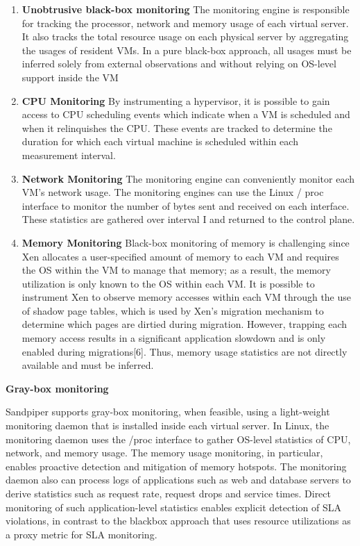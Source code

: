 \documentclass[conference]{IEEEtran}
\begin{document}
\begin{enumerate}
\item{\textbf{Unobtrusive black-box monitoring}} The monitoring engine is responsible for tracking the processor, network and memory usage of each virtual server.
It also tracks the total resource usage on each physical
server by aggregating the usages of resident VMs.
In a pure black-box approach, all usages must be inferred
solely from external observations and without relying
on OS-level support inside the VM

\item{\textbf{CPU Monitoring}} By instrumenting a hypervisor,
it is possible to gain access to CPU
scheduling events which indicate when a VM is scheduled
and when it relinquishes the CPU. These events are tracked
to determine the duration for which each virtual machine
is scheduled within each measurement interval.

\item{\textbf{Network Monitoring}} The monitoring engine can conveniently
monitor each VM’s network usage. The monitoring engines can use the Linux /
proc interface to monitor the number of bytes sent and received on each interface.
These statistics are gathered over interval I and returned
to the control plane.

\item{\textbf{Memory Monitoring}} Black-box monitoring of memory
is challenging since Xen allocates a user-specified amount
of memory to each VM and requires the OS within the VM
to manage that memory; as a result, the memory utilization
is only known to the OS within each VM. It is possible
to instrument Xen to observe memory accesses within
each VM through the use of shadow page tables, which is
used by Xen’s migration mechanism to determine which
pages are dirtied during migration. However, trapping each
memory access results in a significant application slowdown
and is only enabled during migrations[6]. Thus,
memory usage statistics are not directly available and
must be inferred.


\end{enumerate}


\textbf{Gray-box monitoring}




Sandpiper supports gray-box monitoring, when feasible,
using a light-weight monitoring daemon that is installed
inside each virtual server. In Linux, the monitoring daemon uses the /proc interface to gather OS-level statistics of CPU, network, and memory usage.
The memory usage monitoring, in particular, enables proactive
detection and mitigation of memory hotspots. The
monitoring daemon also can process logs of applications
such as web and database servers to derive statistics such
as request rate, request drops and service times. Direct
monitoring of such application-level statistics enables explicit
detection of SLA violations, in contrast to the blackbox
approach that uses resource utilizations as a proxy
metric for SLA monitoring.
\end{document}
